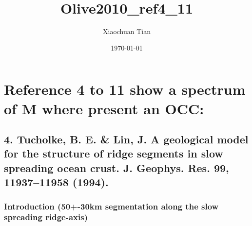 \documentclass[11pt]{article}
\author{Xiaochuan Tian}
\date{\today}
\title{Olive2010\_ref4\_11}
\begin{document}
\maketitle
\tableofcontents

\section{Reference 4 to 11 show a spectrum of M where present an OCC:}
\label{sec-1}
\subsection{4. Tucholke, B. E. \& Lin, J. A geological model for the structure of ridge segments in slow spreading ocean crust. J. Geophys. Res. 99, 11937–11958 (1994).}
\label{sec-1-1}
\subsubsection{Introduction (50+-30km segmentation along the slow spreading ridge-axis)}
\label{sec-1-1-1}
\end{document}
